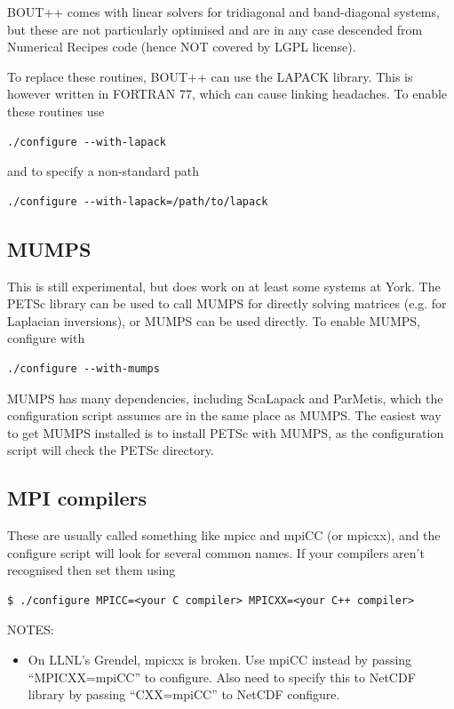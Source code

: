 \documentclass[12pt]{article}
\begin{document}
BOUT++ comes with linear solvers for tridiagonal and band-diagonal systems,
but these are not particularly optimised and are in any case descended from Numerical Recipes code (hence NOT covered by LGPL license).

To replace these routines, BOUT++ can use the LAPACK library. This is
however written in FORTRAN 77, which can cause linking headaches.
To enable these routines use
\begin{verbatim}
./configure --with-lapack
\end{verbatim}
and to specify a non-standard path
\begin{verbatim}
./configure --with-lapack=/path/to/lapack
\end{verbatim}

\subsection{MUMPS}

This is still experimental, but does work on at least some systems at York.
The PETSc library can be used to call MUMPS for directly solving matrices
(e.g. for Laplacian inversions), or MUMPS can be used directly.
To enable MUMPS, configure with
\begin{verbatim}
./configure --with-mumps
\end{verbatim}
MUMPS has many dependencies, including ScaLapack and ParMetis, which the configuration script
assumes are in the same place as MUMPS. The easiest way to get MUMPS installed is to install
PETSc with MUMPS, as the configuration script will check the PETSc directory.

\subsection{MPI compilers}

These are usually called something like mpicc and mpiCC (or mpicxx),
and the configure script will look for several common names.
If your compilers aren't recognised then set them using
\begin{verbatim}
$ ./configure MPICC=<your C compiler> MPICXX=<your C++ compiler>
\end{verbatim}

NOTES:
\begin{itemize}
\item On LLNL's Grendel, mpicxx is broken. Use mpiCC instead by passing ``MPICXX=mpiCC'' to configure. Also need to specify this to NetCDF library by passing ``CXX=mpiCC'' to NetCDF configure.
\end{itemize}
\end{document}
